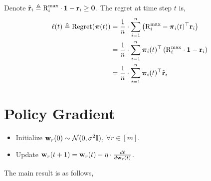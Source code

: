 \documentclass[10pt]{article}
\begin{document}
Denote ${\tilde{\mathbf{r}}}_{i} \triangleq {\text{R}}_i^{\max} \cdot {\mathbf{1}} -  {\mathbf{r}}_{i} \ge {\mathbf{0}}$. The regret at time step $t$ is,
\begin{equation*}
\begin{split}
	\ell(t) \triangleq {\text{Regret}}({\boldsymbol{\pi}}(t)) &= \frac{1}{n} \cdot \sum\limits_{i=1}^{n}{ \left( {\text{R}}_i^{\max} - {\boldsymbol{\pi}}_{i}(t)^\top {\mathbf{r}}_i \right) } \\
	&= \frac{1}{n} \cdot \sum\limits_{i=1}^{n}{ {\boldsymbol{\pi}}_{i}(t)^\top \left( {\text{R}}_i^{\max} \cdot {\mathbf{1}} - {\mathbf{r}}_{i} \right) } \\
	&= \frac{1}{n} \cdot \sum\limits_{i=1}^{n}{ {\boldsymbol{\pi}}_{i}(t)^\top {\tilde{\mathbf{r}}}_{i} }
\end{split}
\end{equation*}

\section{Policy Gradient}

\begin{itemize}
	\item Initialize ${\mathbf{w}}_r(0) \sim {\mathcal{N}}(0, \sigma^2 {\mathbf{I}})$, $\forall r \in [m]$.
	\item Update ${\mathbf{w}}_r(t+1) = {\mathbf{w}}_r(t) - \eta \cdot \frac{d\ell}{d {\mathbf{w}}_r(t)}$.
\end{itemize}

The main result is as follows,
\begin{thm}
\end{thm}
\end{document}
